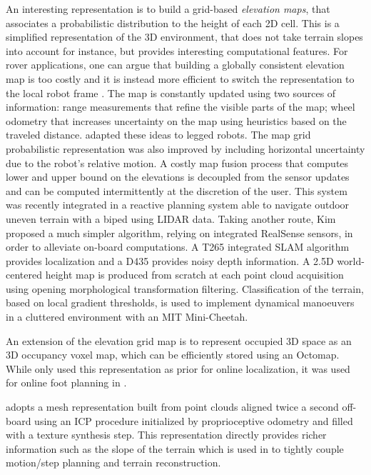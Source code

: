 An interesting representation is to build a grid-based \textit{elevation maps}, that associates a probabilistic distribution to the height of each 2D cell. 
This is a simplified representation of the 3D environment, that does not take terrain slopes into account for instance, but provides interesting computational features. 
For rover applications, one can argue that building a globally consistent elevation map is too costly and it is instead more efficient to switch the representation to 
the local robot frame \cite{kleiner2007real}. 
The map is constantly updated using two sources of information: range measurements that refine the visible parts of the map; wheel odometry that increases uncertainty on the map 
using heuristics based on the traveled distance. \cite{fankhauser2014robot, fankhauser2018probabilistic} adapted these ideas to legged robots. The map grid probabilistic representation
was also improved by including horizontal uncertainty due to the robot's relative motion. A costly map fusion process that computes lower and upper bound on the elevations
is decoupled from the sensor updates and can be computed intermittently at the discretion of the user. This system was recently integrated in a reactive planning system
\cite{huang2021efficient} able to navigate outdoor uneven terrain with a biped using LIDAR data. Taking another route, Kim \cite{kim2020vision} proposed a much 
simpler algorithm, relying on integrated RealSense sensors, in order to alleviate on-board computations. A T265 integrated SLAM algorithm provides localization and 
a D435 provides noisy depth information. A 2.5D world-centered height map is produced from scratch at each point cloud acquisition using opening morphological 
transformation filtering. Classification of the terrain, based on local gradient thresholds, is used to implement dynamical manoeuvers in a cluttered environment
with an MIT Mini-Cheetah.

An extension of the elevation grid map is to represent occupied 3D space as an 3D occupancy voxel map, which can be efficiently stored using an Octomap.
While \cite{hornung2014monte, fallon2014drift} only used this representation as prior for online localization, it was used for online foot planning in 
\cite{winkler2015planning, mastalli2015line}. 

\cite{kolter2009stereo} adopts a mesh representation built from point clouds aligned twice a second off-board using an ICP procedure initialized by proprioceptive odometry and filled with
a texture synthesis step. This representation directly provides richer information such as the slope of the terrain which is used in \cite{mastalli2020motion} to 
tightly couple motion/step planning and terrain reconstruction.

